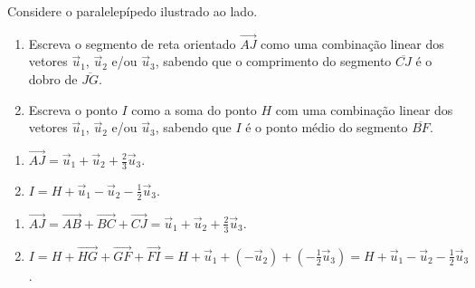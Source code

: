 
\begin{question}
  Considere o paralelepípedo ilustrado ao lado.
  \begin{enumerate}
    \item Escreva o segmento de reta orientado $\overrightarrow{AJ}$ como uma combinação linear dos vetores $\vec u_1$, $\vec u_2$ e/ou $\vec u_3$, sabendo que o comprimento do segmento $\overline{CJ}$ é o dobro de $\overline{JG}$.
    \item Escreva o ponto $I$ como a soma do ponto $H$ com uma combinação linear dos vetores $\vec u_1$, $\vec u_2$ e/ou $\vec u_3$, sabendo que $I$ é o ponto médio do segmento $\overline{BF}$.
  \end{enumerate}

  \begin{center}
    
  \end{center}

  \begin{answer}
    \begin{enumerate}
        \item $\overrightarrow{AJ} = \vec u_1 + \vec u_2 + \frac{2}{3}\vec u_3$.
        \item $I = H + \vec u_1 - \vec u_2 - \frac{1}{2} \vec u_3$.
    \end{enumerate}
  \end{answer}

  \begin{solution}
    \begin{enumerate}
      \item $\overrightarrow{AJ} = \overrightarrow{AB} + \overrightarrow{BC} + \overrightarrow{CJ}
                                 = \vec u_1 + \vec u_2 + \frac{2}{3}\vec u_3$.

      \item
      $
        I = H + \overrightarrow{HG} + \overrightarrow{GF} + \overrightarrow{FI}
          = H + \vec u_1 + \left(-\vec u_2\right) + \left(-\frac{1}{2}\vec u_3\right)
          = H + \vec u_1 - \vec u_2 - \frac{1}{2} \vec u_3
      $.
    \end{enumerate}
  \end{solution}
\end{question}
